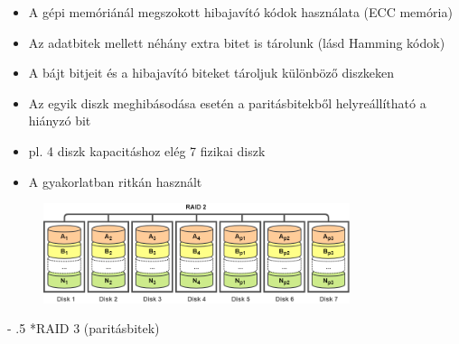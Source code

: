 \documentclass[tikz,12pt,margin=0px]{article}
\makeatletter
\renewcommand\paragraph{%
	\@startsection{paragraph}{4}{0mm}%
	{-\baselineskip}%
	{.5\baselineskip}%
	{\normalfont\normalsize\bfseries}}
\makeatother
\begin{document}
    \begin{itemize}[topsep=8pt,itemsep=4pt,partopsep=4pt, parsep=4pt]
        \item A gépi memóriánál megszokott hibajavító kódok használata (ECC memória)
        \item Az adatbitek mellett néhány extra bitet is tárolunk (lásd Hamming kódok)
        \item A bájt bitjeit és a hibajavító biteket tároljuk különböző diszkeken
        \item Az egyik diszk meghibásodása esetén a paritásbitekből helyreállítható a hiányzó bit
        \item pl. 4 diszk kapacitáshoz elég 7 fizikai diszk
        \item A gyakorlatban ritkán használt
    \end{itemize}

    \begin{figure}[H]
        \centering
        \includegraphics[width=0.8\textwidth]{img/raid2.png}
        \label{ref:raid2}
    \end{figure}

	\paragraph*{RAID 3 (paritásbitek)}
\end{document}
